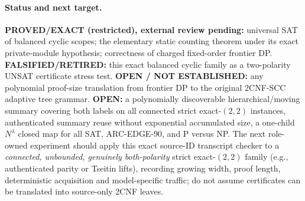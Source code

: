 \documentclass[11pt]{article}
\begin{document}
\paragraph{Status and next target.}
\textbf{PROVED/EXACT (restricted), external review pending:} universal SAT of balanced cyclic scopes; the elementary static counting theorem under its exact private-module hypothesis; correctness of charged fixed-order frontier DP. \textbf{FALSIFIED/RETIRED:} this exact balanced cyclic family as a two-polarity UNSAT certificate stress test. \textbf{OPEN / NOT ESTABLISHED:} any polynomial proof-size translation from frontier DP to the original 2CNF-SCC adaptive tree grammar. \textbf{OPEN:} a polynomially discoverable hierarchical/moving summary covering both labels on all connected strict exact-$(2,2)$ instances, authenticated summary reuse without exponential accumulated size, a one-child $N^\lambda$ closed map for all SAT, ARC-EDGE-90, and P versus NP. The next role-owned experiment should apply this exact source-ID transcript checker to a \emph{connected, unbounded, genuinely both-polarity} strict exact-$(2,2)$ family (e.g., authenticated parity or Tseitin lifts), recording growing width, proof length, deterministic acquisition and model-specific traffic; do not assume certificates can be translated into source-only 2CNF leaves.


\end{document}
